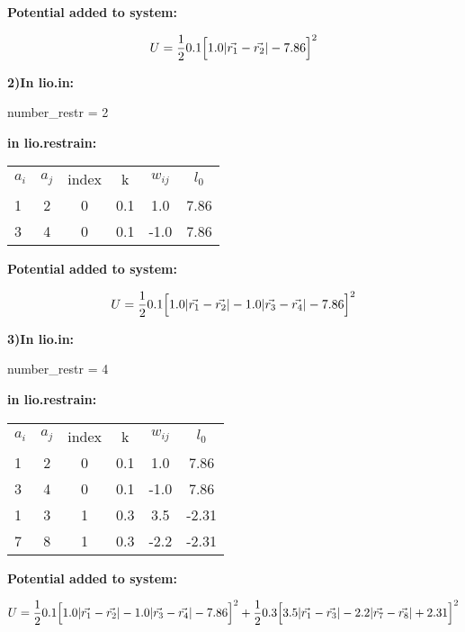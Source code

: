 \documentclass[journal=jctcce,manuscript=article]{achemso}
\begin{document}
    \textbf{Potential added to system:}

    \begin{equation}
      U=\frac{1}{2} 0.1 \Big{[} 1.0 |\vec{r_1} - \vec{r_2}| - 7.86\Big{]}^2  
      \label{Ex1}
    \end{equation}


    \textbf{2)In lio.in:}

    number\_restr = 2

    \textbf{in lio.restrain:}

    \begin{table}  [H]
      \begin{center}
      \begin{tabular}{ l c c c c c}
         $a_i$ & $a_j$ & index &   k  &    $w_{ij}$   &  $l_0$    \\
         1  &  2 &   0   &  0.1 &    1.0   & 7.86   \\
         3  &  4 &   0   &  0.1 &   -1.0   & 7.86   \\
       \end{tabular}
       \end{center}
      \label{Tex2}
    \end{table}

    \textbf{Potential added to system:}

    \begin{equation}
      U=\frac{1}{2} 0.1 \Big{[} 1.0 |\vec{r_1} - \vec{r_2}| - 1.0 |\vec{r_3} - \vec{r_4}| - 7.86\Big{]}^2  
      \label{Ex2}
    \end{equation}


    \textbf{3)In lio.in:}

    number\_restr = 4

    \textbf{in lio.restrain:}

    \begin{table}  [H]
      \begin{center}
      \begin{tabular}{ l c c c c c}
         $a_i$ & $a_j$ & index &   k  &    $w_{ij}$   &  $l_0$    \\
         1  &  2 &   0   &  0.1 &    1.0   & 7.86   \\
         3  &  4 &   0   &  0.1 &   -1.0   & 7.86   \\
         1  &  3 &   1   &  0.3 &    3.5   & -2.31   \\
         7  &  8 &   1   &  0.3 &   -2.2   & -2.31   \\
       \end{tabular}
       \end{center}
      \label{Tex3}
    \end{table}

    \textbf{Potential added to system:}

    \begin{equation}
      U=\frac{1}{2} 0.1 \Big{[} 1.0 |\vec{r_1} - \vec{r_2}| - 1.0 |\vec{r_3} - \vec{r_4}| - 7.86\Big{]}^2 + \frac{1}{2} 0.3 \Big{[} 3.5 |\vec{r_1} - \vec{r_3}| - 2.2 |\vec{r_7} - \vec{r_8}| +2.31\Big{]}^2 
      \label{Ex3}
    \end{equation}
\end{document}
